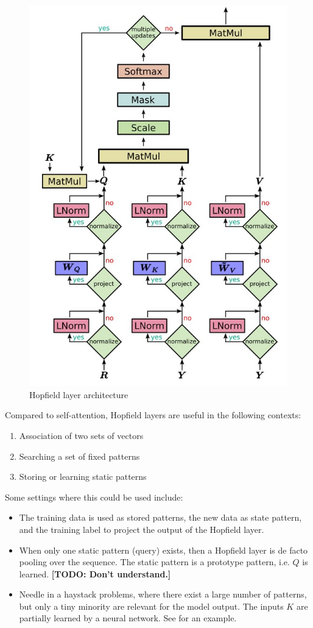 \documentclass[11pt]{article}
\numberwithin{equation}{section}
\begin{document}
\begin{figure}
\begin{center}
\includegraphics[width=0.6\columnwidth]{../figures/hopfield-layer.jpg}  
\end{center}
\caption{Hopfield layer architecture}
\label{fig:hopfield-layer}
\end{figure}

Compared to self-attention, Hopfield layers are useful in the following contexts:
\begin{enumerate}[noitemsep]
\item Association of two sets of vectors
\item Searching a set of fixed patterns
\item Storing or learning static patterns
\end{enumerate}
Some settings where this could be used include:
\begin{itemize}[noitemsep]
\item The training data is used as stored patterns, the new data as state pattern, and the training label to project the output of the Hopfield layer.
\item When only one static pattern (query) exists, then a Hopfield layer is de facto pooling over the sequence. The static pattern is a prototype pattern, i.e. $Q$ is learned. \textbf{[TODO: Don't understand.]}
\item Needle in a haystack problems, where there exist a large number of patterns, but only a tiny minority are relevant for the model output. The inputs $K$ are partially learned by a neural network. See \citep{Widrich20} for an example.
\end{itemize}
\end{document}
